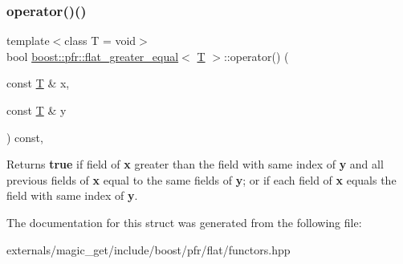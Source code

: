 \subsubsection{\texorpdfstring{operator()()}{operator()()}}
{\footnotesize\ttfamily template$<$class T  = void$>$ \\
bool \mbox{\hyperlink{structboost_1_1pfr_1_1flat__greater__equal}{boost\+::pfr\+::flat\+\_\+greater\+\_\+equal}}$<$ \mbox{\hyperlink{struct_t}{T}} $>$\+::operator() (\begin{DoxyParamCaption}\item[{const \mbox{\hyperlink{struct_t}{T}} \&}]{x,  }\item[{const \mbox{\hyperlink{struct_t}{T}} \&}]{y }\end{DoxyParamCaption}) const\hspace{0.3cm}{\ttfamily [inline]}, {\ttfamily [noexcept]}}

\begin{DoxyReturn}{Returns}
{\bfseries true} if field of {\bfseries x} greater than the field with same index of {\bfseries y} and all previous fields of {\bfseries x} equal to the same fields of {\bfseries y}; or if each field of {\bfseries x} equals the field with same index of {\bfseries y}.
\end{DoxyReturn}


The documentation for this struct was generated from the following file\+:\begin{DoxyCompactItemize}
\item 
externals/magic\+\_\+get/include/boost/pfr/flat/functors.\+hpp\end{DoxyCompactItemize}

